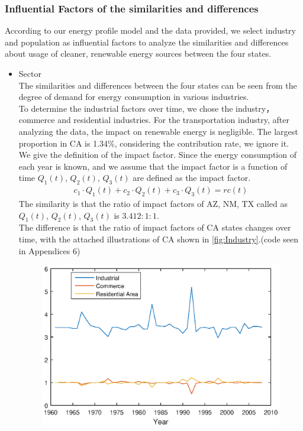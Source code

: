 \subsubsection{Influential Factors of the similarities and differences}
According to our energy profile model and the data provided, we select industry and population as influential factors to analyze the similarities and differences about usage of cleaner, renewable energy sources between the four states. 
\begin{itemize}
	\item Sector\\
	The similarities and differences between the four states can be seen from the degree of demand for energy consumption in various industries.\\ To determine the industrial factors over time, we chose the industry，commerce and residential industries. For the transportation industry, after analyzing the data, the impact on renewable energy is negligible. The largest proportion in CA is 1.34\%, considering the contribution rate, we ignore it.\\
	We give the definition of the impact factor. Since the energy consumption of each year is known, and we assume that the impact factor is a function of time $ Q_{1}(t) $, $ Q_{2}(t) $, $ Q_{3}(t) $ are defined as the impact factor.
	\begin{gather}
	c_{1} \cdot Q_{1}(t)+c_{2} \cdot Q_{2}(t)+c_{3} \cdot Q_{3}(t)=\mathit{rc(t)}
	\end{gather}
The similarity is that the ratio of impact factors of AZ, NM, TX called as $ Q_{1}(t) $, $ Q_{2}(t) $, $ Q_{3}(t) $ is $ 3.412:1:1 $.\\
The difference is that the ratio of impact factors of CA states changes over time, with the attached illustrations of CA shown in \autoref{fig:Industry}.(code seen in Appendices 6)
	\begin{figure}[h]
		\centering
		\includegraphics[width=12cm]{figure/Factorsofthesimilaritiesanddifferences}

\end{figure}
\end{itemize}
